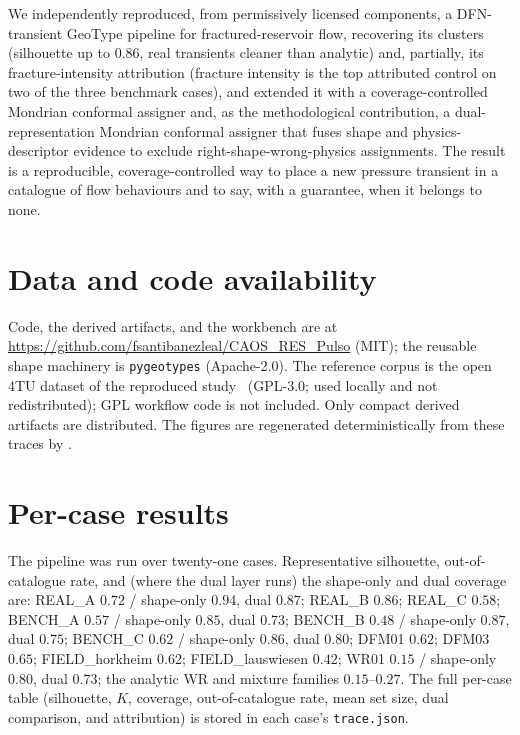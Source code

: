 \documentclass[journal]{IEEEtran}
\begin{document}
We independently reproduced, from permissively licensed components, a DFN-transient GeoType pipeline
for fractured-reservoir flow, recovering its clusters (silhouette up to $0.86$, real transients
cleaner than analytic) and, partially, its fracture-intensity attribution (fracture intensity is the
top attributed control on two of the three benchmark cases), and extended it with a
coverage-controlled Mondrian conformal assigner and, as the methodological contribution, a
dual-representation Mondrian conformal assigner that fuses shape and physics-descriptor evidence to
exclude right-shape-wrong-physics assignments. The result is a reproducible, coverage-controlled way
to place a new pressure transient in a catalogue of flow behaviours and to say, with a guarantee,
when it belongs to none.

\section*{Data and code availability}

{\raggedright
Code, the derived artifacts, and the workbench are at
\url{https://github.com/fsantibanezleal/CAOS_RES_Pulso} (MIT); the reusable shape machinery is
\texttt{pygeotypes} (Apache-2.0). The reference corpus is the open 4TU dataset of the reproduced
study~\cite{data4tu} (GPL-3.0; used locally and not redistributed); GPL workflow code is not
included. Only compact derived artifacts are distributed. The figures are regenerated
deterministically from these traces by
.\par}

\appendices
\section{Per-case results}
\label{ap:cases}
The pipeline was run over twenty-one cases. Representative silhouette, out-of-catalogue
rate, and (where the dual layer runs) the shape-only and dual coverage are: REAL\_A $0.72$ /
shape-only $0.94$, dual $0.87$; REAL\_B $0.86$; REAL\_C $0.58$; BENCH\_A $0.57$ / shape-only $0.85$, dual $0.73$;
BENCH\_B $0.48$ / shape-only $0.87$, dual $0.75$; BENCH\_C $0.62$ / shape-only $0.86$, dual $0.80$; DFM01 $0.62$; DFM03 $0.65$;
FIELD\_horkheim $0.62$; FIELD\_lauswiesen $0.42$; WR01 $0.15$ / shape-only $0.80$, dual $0.73$; the analytic WR
and mixture families $0.15$--$0.27$. The full per-case table (silhouette, $K$, coverage,
out-of-catalogue rate, mean set size, dual comparison, and attribution) is stored in each case's
\texttt{trace.json}.
\end{document}
